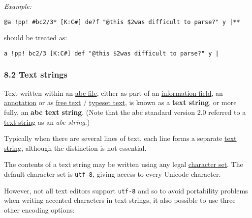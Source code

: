 \emph{Example:}

\begin{verbatim}
@a !pp! #bc2/3* [K:C#] de?f "@this $2was difficult to parse?" y |**
\end{verbatim}

should be treated as:

\begin{verbatim}
a !pp! bc2/3 [K:C#] def "@this $2was difficult to parse?" y |
\end{verbatim}

\hypertarget{text_strings}{\subsubsection{8.2 Text
strings}\label{text_strings}}

\href{}{}Text written within an
\protect\hyperlink{abc_file_definition}{abc file}, either as part of an
\protect\hyperlink{information_field_definition}{information field}, an
\protect\hyperlink{annotations}{annotation} or as
\protect\hyperlink{free_text_definition}{free text} /
\protect\hyperlink{typeset_text_definition}{typeset text}, is known as a
\textbf{text string}, or more fully, an \textbf{abc text string}. (Note
that the abc standard version 2.0 referred to a
\protect\hyperlink{text_string_definition}{text string} as an \emph{abc
string}.)

Typically when there are several lines of text, each line forms a
separate \protect\hyperlink{text_string_definition}{text string},
although the distinction is not essential.

The contents of a text string may be written using any legal
\protect\hyperlink{charset_field}{character set}. The default character
set is \texttt{utf-8}, giving access to every Unicode character.

However, not all text editors support \texttt{utf-8} and so to avoid
portability problems when writing accented characters in text strings,
it also possible to use three other encoding options:

